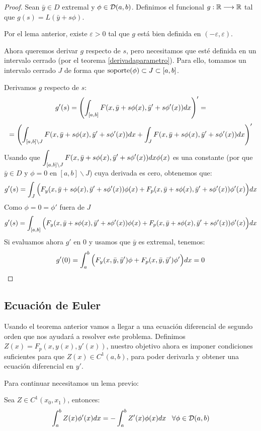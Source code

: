 \begin{proof}
Sean $\bar{y}\in D$ extremal y $\phi\in\mathcal{D}(a,b)$. Definimos el funcional $g:\mathbb{R}\longrightarrow\mathbb{R}$ tal que $g(s)=L(\bar{y}+s\phi)$.

Por el lema anterior, existe $\varepsilon>0$ tal que $g$ está bien definida en $(-\varepsilon,\varepsilon)$.

Ahora queremos derivar $g$ respecto de $s$, pero necesitamos que esté definida en un intervalo cerrado (por el teorema \ref{derivadaparametro}). Para ello, tomamos un intervalo cerrado $J$ de forma que $\operatorname{soporte} (\phi)\subset J\subset [a,b]$. 

Derivamos $g$ respecto de $s$:
\[
g'(s)=\left(
\displaystyle\int_{ [a,b] }^{  } F(x,\bar{y}+s\phi(x),\bar{y}'+s\phi'(x))dx
\right)'=
\]
\[
=\left(
\displaystyle\int_{ [a,b]\backslash J }^{  } F(x,\bar{y}+s\phi(x),\bar{y}'+s\phi'(x))dx+
\displaystyle\int_{ J }^{  } F(x,\bar{y}+s\phi(x),\bar{y}'+s\phi'(x))dx
\right)'
\]
Usando que $\displaystyle\int_{ [a,b]\backslash J }^{  } F(x,\bar{y}+s\phi(x),\bar{y}'+s\phi'(x))dx\phi(x)$ es una constante (por que $\bar{y}\in D$ y $\phi = 0$ en $[a,b]\backslash J$) cuya derivada es cero, obtenemos que:
\[
g'(s)= \displaystyle\int_{ J }^{  } \Big(F_y(x,\bar{y}+s\phi(x),\bar{y}'+s\phi'(x))\phi(x)+F_p(x,\bar{y}+s\phi(x),\bar{y}'+s\phi'(x))\phi'(x)\Big)dx
\]
Como $\phi=0=\phi'$ fuera de $J$
\[
g'(s)= \displaystyle\int_{ [a,b] }^{  } \Big(F_y(x,\bar{y}+s\phi(x),\bar{y}'+s\phi'(x))\phi(x)+F_p(x,\bar{y}+s\phi(x),\bar{y}'+s\phi'(x))\phi'(x)\Big)dx
\]
Si evaluamos ahora $g'$ en 0 y usamos que $\bar{y}$ es extremal, tenemos:
\[
g'(0)=\displaystyle\int_{ a }^{ b } \Big(F_y(x,\bar{y},\bar{y}')\phi+F_p(x,\bar{y},\bar{y}')\phi'\Big)dx=0 
\]
\end{proof}

\subsection{Ecuación de Euler}

Usando el teorema anterior vamos a llegar a una ecuación diferencial de segundo orden que nos ayudará a resolver este problema. Definimos $Z(x)=F_p(x,y(x),y'(x))$, nuestro objetivo ahora es imponer condiciones suficientes para que $Z(x)\in C^1(a,b)$, para poder derivarla y obtener una ecuación diferencial en $y'$.

Para continuar necesitamos un lema previo:

\begin{lemma}
Sea $Z\in C^1(x_0,x_1)$, entonces:
\[
\displaystyle\int_{ a }^{ b } Z(x)\phi'(x)dx=-\displaystyle\int_{ a }^{ b } Z'(x)\phi(x)dx \;\;\; \forall \phi\in\mathcal{D}(a,b)
\]
\end{lemma}

